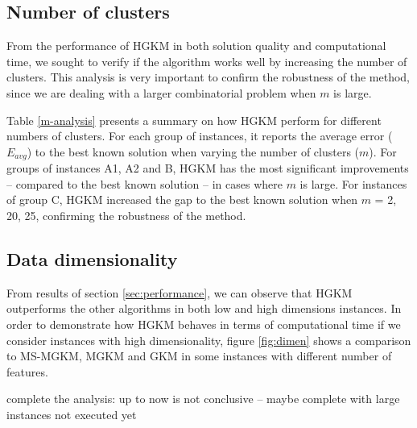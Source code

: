 





\subsection{Number of clusters}
From the performance of HGKM in both solution quality and computational time, we sought to verify if the algorithm works well by increasing the number of clusters. %
This analysis is very important to confirm the robustness of the method, since we are dealing with a larger combinatorial problem when $m$ is large.

Table \ref{m-analysis} presents a summary on how HGKM perform for different numbers of clusters.
For each group of instances, it reports the average error ($E_{avg}$) to the best known solution when varying the number of clusters ($m$). For groups of instances A1, A2 and B, HGKM has the most significant improvements -- compared to the best known solution -- in cases where $m$ is large.%
For instances of group C, HGKM increased the gap to the best known solution when $m$ = 2, 20, 25, confirming the robustness of the method.



\subsection{Data dimensionality}
From results of section \ref{sec:performance}, we can observe that HGKM outperforms the other algorithms in both low and high dimensions instances. In order to demonstrate how HGKM behaves in terms of computational time if we consider instances with high dimensionality, figure \ref{fig:dimen} shows a comparison to MS-MGKM, MGKM and GKM in some instances with different number of features.

\noindent [TO-DO] complete the analysis: up to now is not conclusive -- maybe complete with large instances not executed yet

